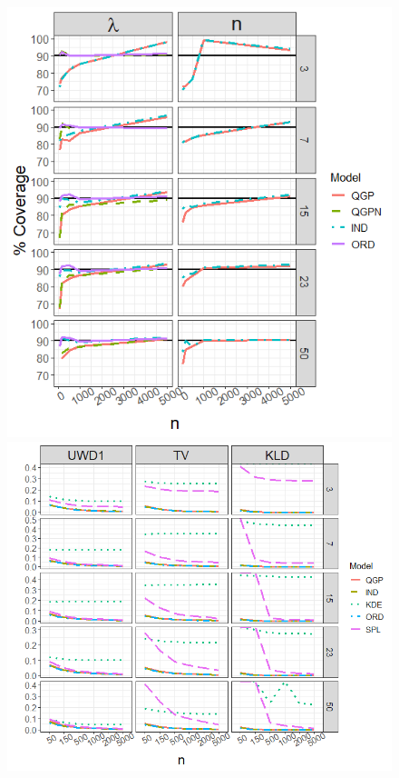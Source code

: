 \documentclass[preprint,12pt,authoryear]{elsarticle}
\begin{document}
\begin{figure}[hbt!]
  \includegraphics[width=\linewidth]{Images/exponential_coverage.png}
  \includegraphics[width=\linewidth]{Images/exponential_dists.png}

\end{figure}
\end{document}

